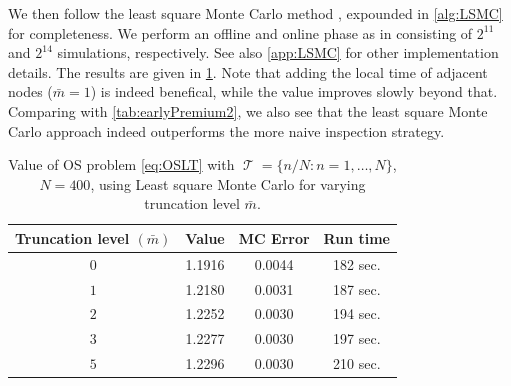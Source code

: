 \documentclass[11pt]{article}
\theoremstyle{plain}
\theoremstyle{definition}
\DeclareMathOperator{\calT}{\mathcal{T}}
\begin{document}
We then follow the  least square Monte Carlo method  \cite{LS}, 
expounded in \cref{alg:LSMC} for completeness. 
We perform an  offline and online phase as  in \cite[
Remark 6.8]{GuyonHL} consisting of  $2^{11}$ and $2^{14}$ simulations,  respectively. See also \cref{app:LSMC} for other implementation details. The results are given in \cref{tab:LSMC}. Note that adding the local time of adjacent nodes ($\bar{m} = 1$) is indeed benefical, while  the value improves slowly beyond that. Comparing with \cref{tab:earlyPremium2}, we also see that the least square Monte Carlo approach indeed outperforms the more  naive inspection strategy. %
\begin{table}[h]
    \centering
        \caption{Value of OS problem \eqref{eq:OSLT} with  $\calT = \{n/N : n=1,\ldots,N\}$, $N = 400$, using Least square Monte Carlo for varying truncation level $\bar{m}$.  }%
    \begin{tabular}{cccc}
      Truncation level $(\bar{m})$ &  Value & MC Error & Run time \\ \hline\hline
       $0$   & 1.1916 & 0.0044 & 182 sec. \\
        $1$   & 1.2180 & 0.0031 & 187 sec. \\ 
      $2$   & 1.2252 & 0.0030 & 194 sec. \\
       $3$   &  1.2277 & 0.0030 & 197 sec. \\
       $5$   & 1.2296 & 0.0030 & 210 sec. \\
      \end{tabular}
    \label{tab:LSMC}
\end{table}
\end{document}
